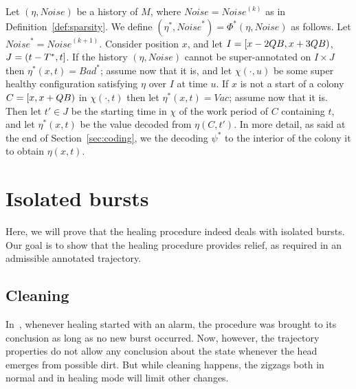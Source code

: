 \documentclass[12pt]{memoir}
\def\B{B}
\newcommand{\Bad}{\mathit{Bad}}
\newcommand{\Vacant}{\mathit{Vac}}
\newcommand{\Noise}{\mathit{Noise}}
\newcommand{\Tus}{T^{*}}
\begin{document}
\begin{definition}\label{def:cleanness-scaleup}
Let \( (\eta,\Noise) \) be a history of \( M \), where \( \Noise=\Noise^{(k)} \)
as in Definition~\ref{def:sparsity}.
We define \( (\eta^{*},\Noise^{*})=\Phi^{*}(\eta,\Noise) \) as follows.
Let \( \Noise^{*}=\Noise^{{(k+1)}} \).
Consider position \( x \), and let \( I=\lint{x-2Q\B}{x+3Q\B} \),
\( J=\rint{t-\Tus}{t} \).
If the history \( (\eta,\Noise) \) cannot be super-annotated on \( I\times J \)
then \( \eta^{*}(x,t)=\Bad^{*} \); assume now that it is, and let
\( \chi(\cdot,u) \) be some super healthy configuration satisfying \( \eta \) over 
\( I \) at time \( u \).
If \( x \) is not a start of a colony \( C=\lint{x}{x+Q\B} \) in \( \chi(\cdot,t) \)
then let \( \eta^{*}(x,t)=\Vacant \); assume now that it is.
Then let \( t'\in J \) be the starting time in \( \chi \) of the work period of \( C \)
containing \( t \),
and let \( \eta^{*}(x,t) \) be the value decoded from \( \eta(C,t') \).
In more detail, as said at the end of Section~\ref{sec:coding}, we the decoding
\( \psi^{*} \) to the interior of the colony it to obtain \( \eta(x,t) \).
\end{definition}




\section{Isolated bursts}\label{sec:1-level-noise}

Here, we will prove that the healing procedure indeed deals with isolated bursts.
Our goal is to show that the healing procedure provides relief, as required in an
admissible annotated trajectory.



\subsection{Cleaning}

In~\cite{burstyTuring13}, whenever healing started with an alarm, the procedure
was brought to its conclusion as long as no new burst occurred.
Now, however, the trajectory properties do not allow any conclusion about the
state whenever the head emerges from possible dirt.
But while cleaning happens, the
zigzags both in normal and in healing mode will limit other changes.
\end{document}
